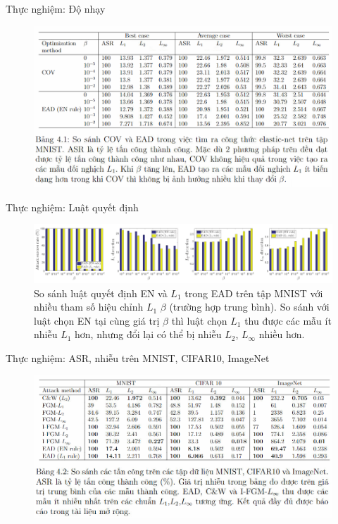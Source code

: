 \begin{frame}{Thực nghiệm: Độ nhạy}
    \begin{figure}
        \centering
        \includegraphics[scale=0.5]{images/tab_4_1.png}
    \end{figure}
\end{frame}

\begin{frame}{Thực nghiệm: Luật quyết định}
    \begin{figure}[H] %
        \centering %
        \includegraphics[width=1\textwidth]{images/fig_02.png} 
        \caption{So sánh luật quyết định EN và $L_1$ trong EAD trên tập MNIST với nhiều tham số hiệu chỉnh $L_1$ $\beta$ (trường hợp trung bình). So sánh với luật chọn EN tại cùng giá trị $\beta$ thì luật chọn $L_1$ thu được các mẫu ít nhiễu $L_1$ hơn, nhưng đổi lại có thể bị nhiễu $L_2$, $L_{\infty}$ nhiều hơn.}%
        \label{fig:fg_02}
    \end{figure}
\end{frame}

\begin{frame}{Thực nghiệm: ASR, nhiễu trên MNIST, CIFAR10, ImageNet}
    \begin{figure}
        \centering
        \includegraphics[scale=0.55]{images/tab_4_2.png}
    \end{figure}
\end{frame}

